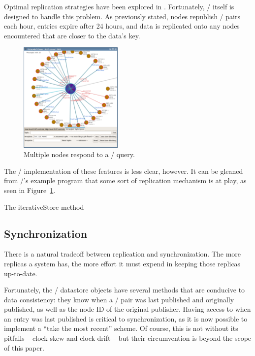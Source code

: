 \documentclass[11pt,twocolumn]{article}
\begin{document}
Optimal replication strategies have been explored in \cite{cohen}.
Fortunately, \Kademlia/ itself is designed to handle this problem.
As previously stated, nodes republish \kv/ pairs each hour, entries expire after 24 hours, and data is replicated onto any nodes encountered that are closer to the data's key.

\begin{figure}[h!]
  \centering
  \includegraphics[width=0.45\textwidth]{images/entangled_replication}
  \caption{\label{entangled_replication}Multiple nodes respond to a \findValue/ query.}
\end{figure}

The \Entangled/ implementation of these features is less clear, however.
It can be gleaned from \Entangled/'s example program that some sort of replication mechanism is at play, as seen in Figure~\ref{entangled_replication}.

The {\sc iterativeStore} method %

\subsection{Synchronization}
There is a natural tradeoff between replication and synchronization.
The more replicas a system has, the more effort it must expend in keeping those replicas up-to-date.

Fortunately, the \Entangled/ datastore objects have several methods that are conducive to data consistency: they know when a \kv/ pair was last published and originally published, as well as the node ID of the original publisher.
Having access to when an entry was last published is critical to synchronization, as it is now possible to implement a ``take the most recent'' scheme.
Of course, this is not without its pitfalls -- clock skew and clock drift -- but their circumvention is beyond the scope of this paper.
\end{document}
